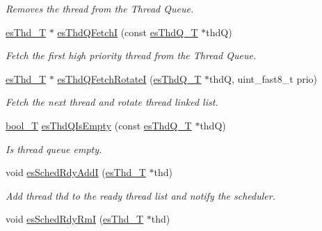\begin{DoxyCompactItemize}
\begin{DoxyCompactList}\small\item\em Removes the thread from the Thread Queue. \end{DoxyCompactList}\item 
\hyperlink{group__kern__thd_ga62e3a3ca0a4597a19c43cb8868810d82}{es\-Thd\-\_\-\-T} $\ast$ \hyperlink{group__kern__impl_ga1670c123f31c346b24ec9d2b7ae35f88}{es\-Thd\-Q\-Fetch\-I} (const \hyperlink{group__kern__thdq_ga7a1a060699e83a01512ebb5540019556}{es\-Thd\-Q\-\_\-\-T} $\ast$thd\-Q)
\begin{DoxyCompactList}\small\item\em Fetch the first high priority thread from the Thread Queue. \end{DoxyCompactList}\item 
\hyperlink{group__kern__thd_ga62e3a3ca0a4597a19c43cb8868810d82}{es\-Thd\-\_\-\-T} $\ast$ \hyperlink{group__kern__impl_gae365b14292f1496a90d876baec84fb4e}{es\-Thd\-Q\-Fetch\-Rotate\-I} (\hyperlink{group__kern__thdq_ga7a1a060699e83a01512ebb5540019556}{es\-Thd\-Q\-\_\-\-T} $\ast$thd\-Q, uint\-\_\-fast8\-\_\-t prio)
\begin{DoxyCompactList}\small\item\em Fetch the next thread and rotate thread linked list. \end{DoxyCompactList}\item 
\hyperlink{group__template__compiler_ga74fbee312f9185efb602f89d21b53404}{bool\-\_\-\-T} \hyperlink{group__kern__impl_gacf2687b82ce64e2154d97fd3b69a4ab5}{es\-Thd\-Q\-Is\-Empty} (const \hyperlink{group__kern__thdq_ga7a1a060699e83a01512ebb5540019556}{es\-Thd\-Q\-\_\-\-T} $\ast$thd\-Q)
\begin{DoxyCompactList}\small\item\em Is thread queue empty. \end{DoxyCompactList}\item 
void \hyperlink{group__kern__impl_ga73e14b1860ce824c822adc407aee0977}{es\-Sched\-Rdy\-Add\-I} (\hyperlink{group__kern__thd_ga62e3a3ca0a4597a19c43cb8868810d82}{es\-Thd\-\_\-\-T} $\ast$thd)
\begin{DoxyCompactList}\small\item\em Add thread {\ttfamily thd} to the ready thread list and notify the scheduler. \end{DoxyCompactList}\item 
void \hyperlink{group__kern__impl_ga0b8263c5024ebb59cd9b95cc9253b44d}{es\-Sched\-Rdy\-Rm\-I} (\hyperlink{group__kern__thd_ga62e3a3ca0a4597a19c43cb8868810d82}{es\-Thd\-\_\-\-T} $\ast$thd)

\end{DoxyCompactItemize}
